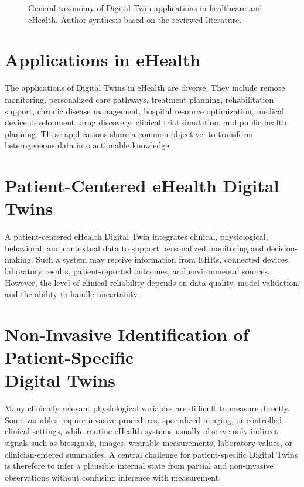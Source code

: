 \begin{figure}[H]
    \centering
    \resizebox{0.95\textwidth}{!}{}
    \caption{General taxonomy of Digital Twin applications in healthcare and eHealth. Author synthesis based on the reviewed literature.}
    \label{fig:healthcare_dt_taxonomy}
\end{figure}

\section{Applications in eHealth}
The applications of Digital Twins in eHealth are diverse. They include remote monitoring, personalized care pathways, treatment planning, rehabilitation support, chronic disease management, hospital resource optimization, medical device development, drug discovery, clinical trial simulation, and public health planning. These applications share a common objective: to transform heterogeneous data into actionable knowledge.

\section{Patient-Centered eHealth Digital Twins}
A patient-centered eHealth Digital Twin integrates clinical, physiological, behavioral, and contextual data to support personalized monitoring and decision-making. Such a system may receive information from EHRs, connected devices, laboratory results, patient-reported outcomes, and environmental sources. However, the level of clinical reliability depends on data quality, model validation, and the ability to handle uncertainty.

\section[Non-Invasive Identification of Patient-Specific Digital Twins]{Non-Invasive Identification of Patient-Specific\\ Digital Twins}
Many clinically relevant physiological variables are difficult to measure directly. Some variables require invasive procedures, specialized imaging, or controlled clinical settings, while routine eHealth systems usually observe only indirect signals such as biosignals, images, wearable measurements, laboratory values, or clinician-entered summaries. A central challenge for patient-specific Digital Twins is therefore to infer a plausible internal state from partial and non-invasive observations without confusing inference with measurement.

